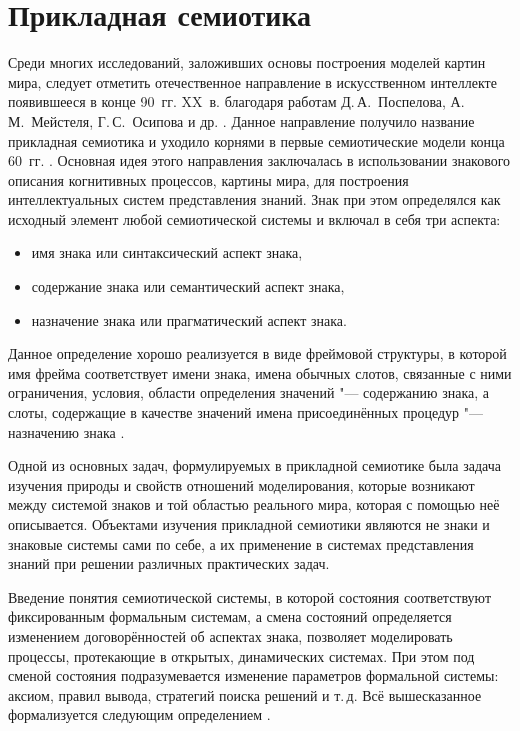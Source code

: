 \section{Прикладная семиотика} \label{sect:semio}

Среди многих исследований, заложивших основы построения моделей картин мира, следует отметить отечественное направление в искусственном интеллекте появившееся в конце 90~гг. XX~в. благодаря работам Д.\,А.~Поспелова, А.\,М.~Мейстеля, Г.\,С.~Осипова и др. \cite{Osipov1995,Pospelov1996,Ehrlich1997,Osipov1999,Osipov2000b,Osipov2002a,Osipov2002b}. Данное направление получило название прикладная семиотика и уходило корнями в первые семиотические модели конца 60~гг. \cite{Pospelov1976}. Основная идея этого направления заключалась в использовании знакового описания когнитивных процессов, картины мира, для построения интеллектуальных систем представления знаний. Знак при этом определялся как исходный элемент любой семиотической системы и включал в себя три аспекта:
\begin{itemize}
	\item имя знака или синтаксический аспект знака,
	\item содержание знака или семантический аспект знака,
	\item назначение знака или прагматический аспект знака.
\end{itemize}

Данное определение хорошо реализуется в виде фреймовой структуры, в которой имя фрейма соответствует имени знака, имена обычных слотов, связанные с ними ограничения, условия, области определения значений "--- содержанию знака, а слоты, содержащие в качестве значений имена присоединённых процедур "--- назначению знака \cite{Osipov1999}. 

Одной из основных задач, формулируемых в прикладной семиотике была задача изучения природы и свойств отношений моделирования, которые возникают между системой знаков и той областью реального мира, которая с помощью неё описывается. Объектами изучения прикладной семиотики являются не знаки и знаковые системы сами по себе, а  их применение в системах представления знаний при решении различных практических задач.

Введение понятия семиотической системы, в которой состояния соответствуют фиксированным формальным системам, а смена состояний определяется изменением договорённостей об аспектах знака, позволяет моделировать процессы, протекающие в открытых, динамических системах. При этом под сменой состояния подразумевается изменение параметров формальной системы: аксиом, правил вывода, стратегий поиска решений и т.\,д. Всё вышесказанное формализуется следующим определением \cite{Osipov2002a}.

